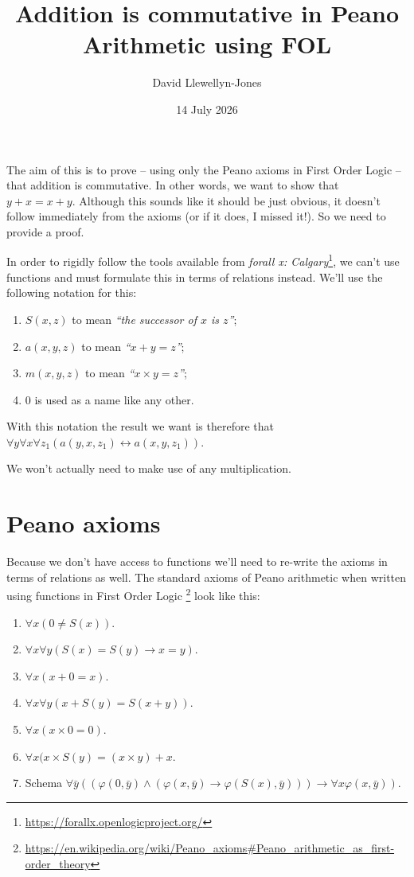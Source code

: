 \documentclass[10pt]{article}
\title{Addition is commutative in Peano Arithmetic using FOL}
\author{David Llewellyn-Jones}
\date{14 July 2026}
\begin{document}
\maketitle

The aim of this is to prove -- using only the Peano axioms in First Order Logic -- that addition is commutative. In other words, we want to show that $y + x = x + y$. Although this sounds like it should be just obvious, it doesn't follow immediately from the axioms (or if it does, I missed it!). So we need to provide a proof.

In order to rigidly follow the tools available from \textit{forall x: Calgary}\footnote{\url{https://forallx.openlogicproject.org/}}, we can't use functions and must formulate this in terms of relations instead. We'll use the following notation for this:

\begin{enumerate}
\item $S(x, z)$ to mean \textit{``the successor of $x$ is $z$''};
\item $a(x, y, z)$ to mean \textit{``$x + y = z$''};
\item $m(x, y, z)$ to mean \textit{``$x \times y = z$''};
\item $0$ is used as a name like any other.
\end{enumerate}

With this notation the result we want is therefore that $\forall y \forall x \forall z_1 (a(y, x, z_1) \leftrightarrow a(x, y, z_1))$.

We won't actually need to make use of any multiplication.

\section*{Peano axioms}

Because we don't have access to functions we'll need to re-write the axioms in terms of relations as well. The standard axioms of Peano arithmetic when written using functions in First Order Logic \footnote{\url{https://en.wikipedia.org/wiki/Peano\_axioms\#Peano\_arithmetic_as\_first-order\_theory}} look like this:

\begin{enumerate}
\item $\forall x (0 \not= S(x))$.
\item $\forall x \forall y (S(x) = S(y) \to x = y)$.
\item $\forall x (x + 0 = x)$.
\item $\forall x \forall y (x + S(y) = S(x + y))$.
\item $\forall x (x \times 0 = 0)$.
\item $\forall x (x \times S(y) = (x \times y) + x$.
\item Schema $\forall \bar{y} \left( \left( \varphi (0, \bar{y}) \land \left( \varphi(x, \bar{y}) \to \varphi(S(x), \bar{y}) \right) \right) \to \forall x \varphi(x, \bar{y}) \right)$.
\end{enumerate}
\end{document}

